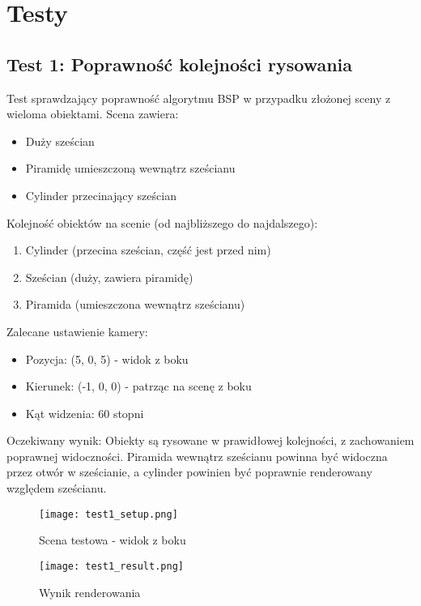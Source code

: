 \documentclass[a4paper,12pt]{article}
\begin{document}
\section{Testy}

\subsection{Test 1: Poprawność kolejności rysowania}
Test sprawdzający poprawność algorytmu BSP w przypadku złożonej sceny z wieloma obiektami. Scena zawiera:
\begin{itemize}
    \item Duży sześcian
    \item Piramidę umieszczoną wewnątrz sześcianu
    \item Cylinder przecinający sześcian
\end{itemize}

Kolejność obiektów na scenie (od najbliższego do najdalszego):
\begin{enumerate}
    \item Cylinder (przecina sześcian, część jest przed nim)
    \item Sześcian (duży, zawiera piramidę)
    \item Piramida (umieszczona wewnątrz sześcianu)
\end{enumerate}

Zalecane ustawienie kamery:
\begin{itemize}
    \item Pozycja: (5, 0, 5) - widok z boku
    \item Kierunek: (-1, 0, 0) - patrząc na scenę z boku
    \item Kąt widzenia: 60 stopni
\end{itemize}

Oczekiwany wynik: Obiekty są rysowane w prawidłowej kolejności, z zachowaniem poprawnej widoczności. Piramida wewnątrz sześcianu powinna być widoczna przez otwór w sześcianie, a cylinder powinien być poprawnie renderowany względem sześcianu.

\begin{figure}[h]
    \centering
    \begin{minipage}{0.48\textwidth}
        \centering
        \texttt{[image: test1\_setup.png]}
        \caption{Scena testowa - widok z boku}
    \end{minipage}
    \hfill
    \begin{minipage}{0.48\textwidth}
        \centering
        \texttt{[image: test1\_result.png]}
        \caption{Wynik renderowania}
    \end{minipage}
\end{figure}
\end{document}
